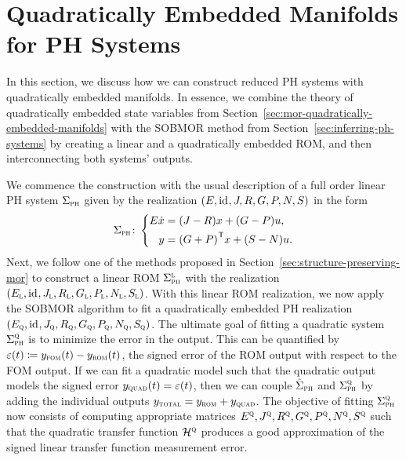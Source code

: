 \section{Quadratically Embedded Manifolds for \texorpdfstring{\ac{PH}}{PH} Systems}\label{sec:quadratically-embedded-manifolds-ph-systems}

In this section, we discuss how we can construct reduced \ac{PH} systems with quadratically embedded manifolds.
In essence, we combine the theory of quadratically embedded state variables from Section~\ref{sec:mor-quadratically-embedded-manifolds} with the \ac{SOBMOR} method from Section~\ref{sec:inferring-ph-systems} by creating a linear and a quadratically embedded \ac{ROM}, and then interconnecting both systems' outputs.

We commence the construction with the usual description of a full order linear \ac{PH} system $\Sigma_{\textnormal{\scshape ph}}$ given by the realization $(E, \text{id}_{}, J, R, G, P, N, S)$ in the form
\begin{equation*}
    \Sigma_{\textnormal{\scshape ph}} \colon \left\lbrace
    \begin{aligned}
        E \dot{x} &= (J - R) x + (G - P) u, \\
        y &= {(G + P)}^{\mkern1mu \mathsf{T}} x + (S - N) u.
    \end{aligned}
    \right.
\end{equation*}
Next, we follow one of the methods proposed in Section~\ref{sec:structure-preserving-mor} to construct a linear \ac{ROM} $\Sigma_{\textnormal{\scshape ph}}^{\textnormal{\scshape l}}$ with the realization $(E_{\textnormal{\scshape l}}, \text{id}_{}, J_{\textnormal{\scshape l}}, R_{\textnormal{\scshape l}}, G_{\textnormal{\scshape l}}, P_{\textnormal{\scshape l}}, N_{\textnormal{\scshape l}}, S_{\textnormal{\scshape l}})$.
With this linear \ac{ROM} realization, we now apply the \ac{SOBMOR} algorithm to fit a quadratically embedded \ac{PH} realization $(E_{\textnormal{\scshape q}}, \text{id}_{}, J_{\textnormal{\scshape q}}, R_{\textnormal{\scshape q}}, G_{\textnormal{\scshape q}}, P_{\textnormal{\scshape q}}, N_{\textnormal{\scshape q}}, S_{\textnormal{\scshape q}})$.
The ultimate goal of fitting a quadratic system $\Sigma_{\textnormal{\scshape ph}}^{\textnormal{\scshape q}}$ is to minimize the error in the output.
This can be quantified by $\varepsilon(t) \coloneqq y_{\textnormal{\scshape fom}}(t) - y_{\textnormal{\scshape rom}}(t)$, the signed error of the \ac{ROM} output with respect to the \ac{FOM} output.
If we can fit a quadratic model such that the quadratic output models the signed error $y_{\textnormal{\scshape quad}}(t) = \varepsilon(t)$, then we can couple $\hat{\Sigma}_{\textnormal{\scshape ph}}$ and $\Sigma_{\textnormal{\scshape ph}}^{\textnormal{\scshape q}}$ by adding the individual outputs $y_{\textnormal{\scshape total}} = y_{\textnormal{\scshape rom}} + y_{\textnormal{\scshape quad}}$.
The objective of fitting $\Sigma_{\textnormal{\scshape ph}}^{\textnormal{\scshape q}}$ now consists of computing appropriate matrices $E^{\textnormal{\scshape q}}, J^{\textnormal{\scshape q}}, R^{\textnormal{\scshape q}}, G^{\textnormal{\scshape q}}, P^{\textnormal{\scshape q}}, N^{\textnormal{\scshape q}}, S^{\textnormal{\scshape q}}$ such that the quadratic transfer function $\mathcal{H}^{\textnormal{\scshape q}}$ produces a good approximation of the signed linear transfer function measurement error.
